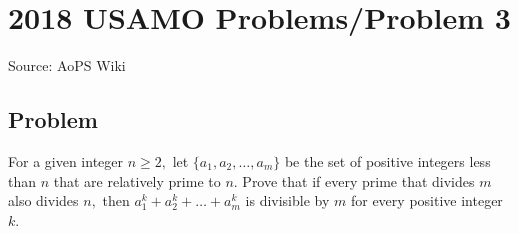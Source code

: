 \documentclass[12pt]{article}
\begin{document}
\section*{{2018 USAMO Problems/Problem 3}}
Source: AoPS Wiki

\subsection*{Problem}
For a given integer $n\ge 2,$ let $\{a_1,a_2,…,a_m\}$ be the set of positive integers less than $n$ that are relatively prime to $n.$ Prove that if every prime that divides $m$ also divides $n,$ then $a_1^k+a_2^k + \dots + a_m^k$ is divisible by $m$ for every positive integer $k.$
\end{document}
